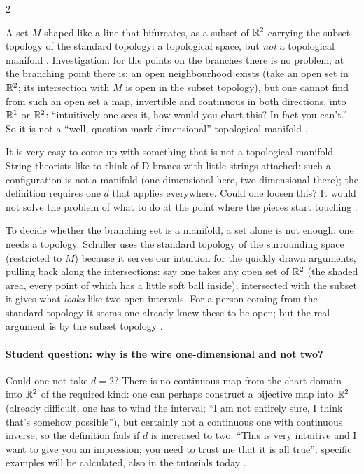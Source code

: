 \begin{paracol}{2}
\begin{example}\label{ex:c02-nonex}
A set $M$ shaped like a line that bifurcates, as a subset of $\mathbb{R}^2$ carrying the subset topology of the standard topology: a topological space, but \emph{not} a topological manifold
. Investigation: for the points on the branches there is no problem; at the branching point there is: an open neighbourhood exists
(take an open set in $\mathbb{R}^2$; its intersection with $M$ is open in the subset topology), but one cannot find from such an open set a map, invertible and continuous in both directions, into $\mathbb{R}^1$ or $\mathbb{R}^2$:
``intuitively one sees it, how would you chart this? In fact you can't.'' So it is not a ``well, question mark-dimensional'' topological manifold .
\end{example}
It is very easy to come up with something that is not a topological manifold. String theorists like to think of D-branes with little strings attached: such a configuration is not a
manifold (one-dimensional here, two-dimensional there); the definition requires one $d$ that applies everywhere. Could one loosen this? It would not solve the problem of what to do at the point
where the pieces start touching .

\begin{coursenote}
To decide whether the branching set is a manifold, a set alone is not enough: one needs a topology. Schuller uses the standard topology of the surrounding space (restricted to $M$) because it serves our intuition for the
quickly drawn arguments, pulling back along the intersections: say one takes any open set of $\mathbb{R}^2$ (the shaded area, every point of which has a little soft ball inside); intersected with the subset it gives what \emph{looks}
like two open intervals. For a person coming from the standard topology it seems one already knew these to be open; but the real argument is by the subset topology .
\end{coursenote}

\paragraph{Student question: why is the wire one-dimensional and not two?} Could one not take $d=2$? There is no continuous map from the chart domain into $\mathbb{R}^2$ of the required kind: one can perhaps construct a bijective map
into $\mathbb{R}^2$ (already difficult, one has to wind the interval; ``I am not entirely sure, I think that's somehow possible''), but certainly not a continuous one with continuous inverse; so the definition fails if $d$ is increased to
two. ``This is very intuitive and I want to give you an impression; you need to trust me that it is all true''; specific examples will be calculated, also in the tutorials today
.


\end{paracol}
